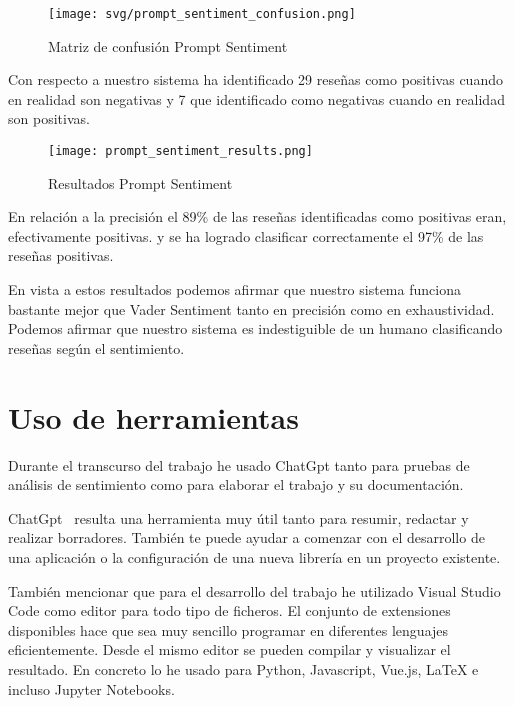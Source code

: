 \begin{figure}[h]
   \advance{} 
   \texttt{[image: svg/prompt\_sentiment\_confusion.png]}
   \caption{Matriz de confusión Prompt Sentiment}
\end{figure}
Con respecto a nuestro sistema ha identificado 29 reseñas como positivas 
cuando en realidad son negativas y 7 que identificado como negativas 
cuando en realidad son positivas.


\begin{figure}[h]
   \advance{} 
   \texttt{[image: prompt\_sentiment\_results.png]}
   \caption{Resultados Prompt Sentiment}
\end{figure}
En relación a la precisión el 89\% de las reseñas identificadas como positivas eran, efectivamente positivas.
y se ha logrado clasificar correctamente el 97\% de las reseñas positivas.

En vista a estos resultados podemos afirmar que nuestro sistema funciona bastante 
mejor que Vader Sentiment tanto en precisión como en exhaustividad. 
Podemos afirmar que nuestro sistema es indestiguible de un humano clasificando 
reseñas según el sentimiento.

\section{Uso de herramientas}
Durante el transcurso del trabajo he usado ChatGpt tanto para pruebas de análisis de sentimiento como 
para elaborar el trabajo y su documentación. 

ChatGpt~\cite{chatgpt1} resulta una herramienta muy útil tanto para resumir, redactar y realizar borradores.
También te puede ayudar a comenzar con el desarrollo de una aplicación 
o la configuración de una nueva librería en un proyecto existente.

También mencionar que para el desarrollo del trabajo he utilizado Visual Studio Code como editor 
para todo tipo de ficheros. 
El conjunto de extensiones disponibles hace que sea muy sencillo programar en diferentes lenguajes eficientemente.
Desde el mismo editor se pueden compilar y visualizar el resultado.
En concreto lo he usado para Python, Javascript, Vue.js, LaTeX e incluso Jupyter Notebooks.



